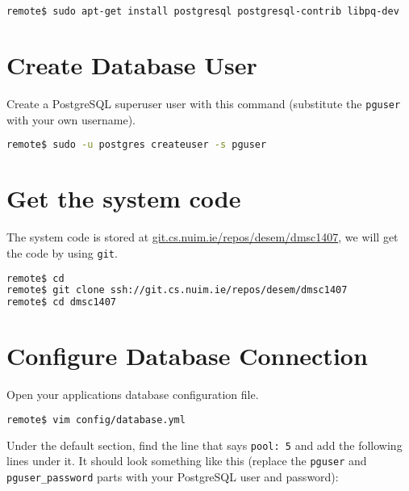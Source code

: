 \begin{minipage}{\linewidth}
\begin{lstlisting}[language=bash]
remote$ sudo apt-get install postgresql postgresql-contrib libpq-dev
\end{lstlisting}
\end{minipage}

\section{Create Database User}

Create a PostgreSQL superuser user with this command
(substitute the \texttt{pguser} with your own username).

\begin{minipage}{\linewidth}
\begin{lstlisting}[language=bash]
remote$ sudo -u postgres createuser -s pguser
\end{lstlisting}
\end{minipage}

\section{Get the system code}

The system code is stored at \url{git.cs.nuim.ie/repos/desem/dmsc1407},
we will get the code by using \texttt{git}.

\begin{minipage}{\linewidth}
\begin{lstlisting}[language=bash]
remote$ cd
remote$ git clone ssh://git.cs.nuim.ie/repos/desem/dmsc1407
remote$ cd dmsc1407
\end{lstlisting}
\end{minipage}

\section{Configure Database Connection}

Open your application\textquotesingle s database configuration file.

\begin{minipage}{\linewidth}
\begin{lstlisting}[language=bash]
remote$ vim config/database.yml
\end{lstlisting}
\end{minipage}

Under the default section, find the line that says \texttt{pool: 5}
and add the following lines under it. It should look something like this
(replace the \texttt{pguser} and \texttt{pguser\_password}
parts with your PostgreSQL user and password):

